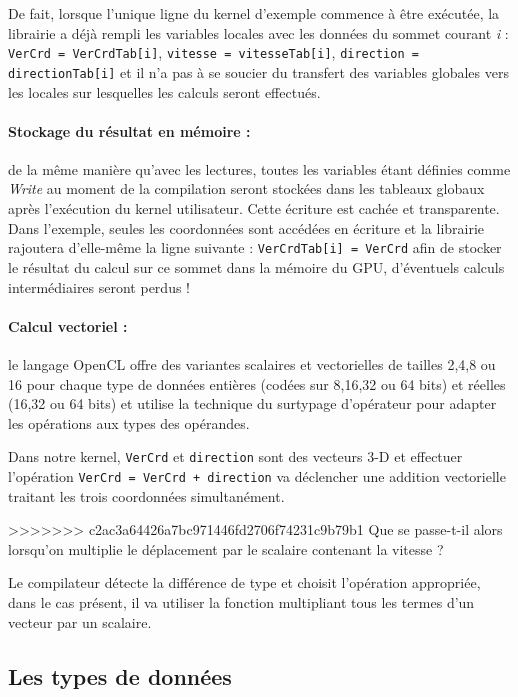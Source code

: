 \documentclass[a4paper,12pt]{article}
\begin{document}
De fait, lorsque l'unique ligne du kernel d'exemple commence à être exécutée, la librairie a déjà rempli les variables locales avec les données du sommet courant \emph{i} : {\tt VerCrd = VerCrdTab[i]}, {\tt vitesse = vitesseTab[i]}, {\tt direction = directionTab[i]} et il n'a pas à se soucier du transfert des variables globales vers les locales sur lesquelles les calculs seront effectués.

\paragraph{Stockage du résultat en mémoire : } de la même manière qu'avec les lectures, toutes les variables étant définies comme \emph{Write} au moment de la compilation seront stockées dans les tableaux globaux après l'exécution du kernel utilisateur.
Cette écriture est cachée et transparente. Dans l'exemple, seules les coordonnées sont accédées en écriture et la librairie rajoutera d'elle-même la ligne suivante : {\tt VerCrdTab[i] = VerCrd} afin de stocker le résultat du calcul sur ce sommet dans la mémoire du GPU, d'éventuels calculs intermédiaires seront perdus !

\paragraph{Calcul vectoriel : } le langage OpenCL offre des variantes scalaires et vectorielles de tailles 2,4,8 ou 16 pour chaque type de données entières (codées sur 8,16,32 ou 64 bits) et réelles (16,32 ou 64 bits) et utilise la technique du surtypage d'opérateur pour adapter les opérations aux types des opérandes.

Dans notre kernel, {\tt VerCrd} et {\tt direction} sont des vecteurs 3-D et effectuer l'opération {\tt VerCrd = VerCrd + direction} va déclencher une addition vectorielle traitant les trois coordonnées simultanément.

>>>>>>> c2ac3a64426a7bc971446fd2706f74231c9b79b1
Que se passe-t-il alors lorsqu'on multiplie le déplacement par le scalaire contenant la vitesse ?

Le compilateur détecte la différence de type et choisit l'opération appropriée, dans le cas présent, il va utiliser la fonction multipliant tous les termes d'un vecteur par un scalaire.


\subsection{Les types de données}
\end{document}
